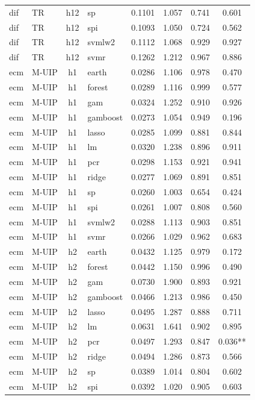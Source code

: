 \begin{ThreePartTable}
\begin{longtable}[t]{llclcccc}
dif & TR & h12 & sp & 0.1101 & 1.057 & 0.741 & 0.601\\
dif & TR & h12 & spi & 0.1093 & 1.050 & 0.724 & 0.562\\
dif & TR & h12 & svmlw2 & 0.1112 & 1.068 & 0.929 & 0.927\\
dif & TR & h12 & svmr & 0.1262 & 1.212 & 0.967 & 0.886\\
\addlinespace
ecm & M-UIP & h1 & earth & 0.0286 & 1.106 & 0.978 & 0.470\\
ecm & M-UIP & h1 & forest & 0.0289 & 1.116 & 0.999 & 0.577\\
ecm & M-UIP & h1 & gam & 0.0324 & 1.252 & 0.910 & 0.926\\
ecm & M-UIP & h1 & gamboost & 0.0273 & 1.054 & 0.949 & 0.196\\
ecm & M-UIP & h1 & lasso & 0.0285 & 1.099 & 0.881 & 0.844\\
ecm & M-UIP & h1 & lm & 0.0320 & 1.238 & 0.896 & 0.911\\
ecm & M-UIP & h1 & pcr & 0.0298 & 1.153 & 0.921 & 0.941\\
ecm & M-UIP & h1 & ridge & 0.0277 & 1.069 & 0.891 & 0.851\\
ecm & M-UIP & h1 & sp & 0.0260 & 1.003 & 0.654 & 0.424\\
ecm & M-UIP & h1 & spi & 0.0261 & 1.007 & 0.808 & 0.560\\
ecm & M-UIP & h1 & svmlw2 & 0.0288 & 1.113 & 0.903 & 0.851\\
ecm & M-UIP & h1 & svmr & 0.0266 & 1.029 & 0.962 & 0.683\\
\addlinespace
ecm & M-UIP & h2 & earth & 0.0432 & 1.125 & 0.979 & 0.172\\
ecm & M-UIP & h2 & forest & 0.0442 & 1.150 & 0.996 & 0.490\\
ecm & M-UIP & h2 & gam & 0.0730 & 1.900 & 0.893 & 0.921\\
ecm & M-UIP & h2 & gamboost & 0.0466 & 1.213 & 0.986 & 0.450\\
ecm & M-UIP & h2 & lasso & 0.0495 & 1.287 & 0.888 & 0.711\\
ecm & M-UIP & h2 & lm & 0.0631 & 1.641 & 0.902 & 0.895\\
ecm & M-UIP & h2 & pcr & 0.0497 & 1.293 & 0.847 & 0.036**\\
ecm & M-UIP & h2 & ridge & 0.0494 & 1.286 & 0.873 & 0.566\\
ecm & M-UIP & h2 & sp & 0.0389 & 1.014 & 0.804 & 0.602\\
ecm & M-UIP & h2 & spi & 0.0392 & 1.020 & 0.905 & 0.603\\

\end{longtable}
\end{ThreePartTable}
